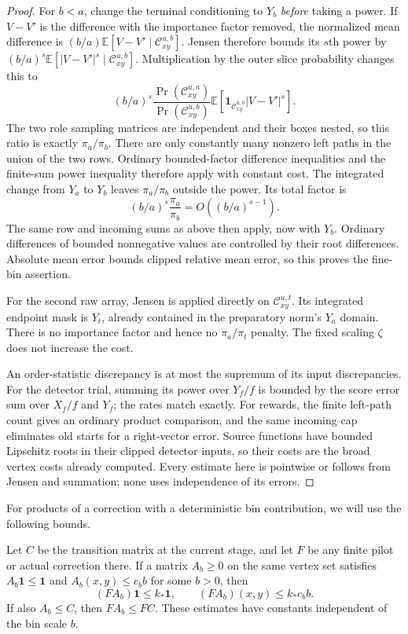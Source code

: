 \begin{proof}
For $b<a$, change the terminal conditioning to $Y_b$ \emph{before}
taking a power. If $V-V'$ is the difference with the importance
factor removed, the normalized mean difference is
$(b/a)\mathbb E[V-V'\mid\mathcal C_{xy}^{u,b}]$.
Jensen therefore bounds its $s$th power by
$(b/a)^s\mathbb E[|V-V'|^s\mid\mathcal C_{xy}^{u,b}]$.
Multiplication by the outer slice probability changes this to
\[
 (b/a)^s\frac{\Pr(\mathcal C_{xy}^{u,a})}
                    {\Pr(\mathcal C_{xy}^{u,b})}
 \mathbb E[\mathbf1_{\mathcal C_{xy}^{u,b}}|V-V'|^s].
\]
The two role sampling matrices are independent and their boxes nested, so
this ratio is exactly $\pi_a/\pi_b$.
There are only constantly many nonzero left paths in the union of the
two rows.  Ordinary bounded-factor difference inequalities and the
finite-sum power inequality therefore apply with constant cost.  The
integrated change from $Y_a$ to $Y_b$ leaves $\pi_a/\pi_b$ outside the
power.  Its total factor is
\[
 (b/a)^s\frac{\pi_a}{\pi_b}=O((b/a)^{s-1}).
\]
The same row and incoming sums as above then apply, now with $Y_b$.
Ordinary differences of bounded nonnegative values are controlled by
their root differences.  Absolute mean error bounds clipped relative
mean error, so this proves the fine-bin assertion.

For the second raw array, Jensen is applied directly on
$\mathcal C_{xy}^{u,t}$.  Its integrated endpoint mask is $Y_t$, already
contained in the preparatory norm's $Y_a$ domain.  There is no importance
factor and hence no $\pi_a/\pi_t$ penalty.  The fixed scaling $\zeta$
does not increase the cost.

An order-statistic discrepancy is at most the supremum of its input discrepancies.
For the detector trial, summing its power over $Y_f/f$ is bounded by the
score error sum over $X_f/f$ and $Y_f$; the rates match exactly.
For rewards, the finite left-path count gives an ordinary product
comparison, and the same incoming cap eliminates old starts for a
right-vector error.  Source functions have bounded Lipschitz roots in
their clipped detector inputs, so their costs are the broad vertex costs
already computed.  Every estimate here is pointwise or follows from
Jensen and summation; none uses independence of its errors.
\end{proof}

For products of a correction with a deterministic bin contribution, we
will use the following bounds.

\begin{lemma}
\label{lem:hier-bin-products}
Let $C$ be the transition matrix at the current stage, and let $F$ be
any finite pilot or actual correction there.  If a matrix $A_b\geq0$
on the same vertex set satisfies $A_b\mathbf 1\leq\mathbf 1$ and
$A_b(x,y)\leq c_b b$ for some $b>0$, then
\[
 (FA_b)\mathbf 1\leq k_*\mathbf 1,
 \qquad (FA_b)(x,y)\leq k_*c_b b.
\]
If also $A_b\leq C$, then $FA_b\leq FC$.  These estimates have constants
independent of the bin scale $b$.
\end{lemma}

